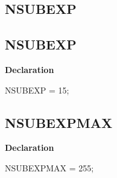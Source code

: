 \documentclass{report}
\newif\ifpdf
\begin{document}
\subsection*{\large{\textbf{NSUBEXP}}\normalsize\hspace{1ex}\hrulefill}
\else
\subsection*{NSUBEXP}
\fi
\label{RegExpr-NSUBEXP}
\begin{list}{}{
\setlength{\itemindent}{0cm}
\setlength{\listparindent}{0cm}
\setlength{\leftmargin}{\evensidemargin}
\addtolength{\leftmargin}{\tmplength}
\settowidth{\labelsep}{X}
\addtolength{\leftmargin}{\labelsep}
\setlength{\labelwidth}{\tmplength}
}
\item[\textbf{Declaration}\hfill]
\ifpdf
\begin{flushleft}
\fi
\begin{ttfamily}
NSUBEXP = 15;\end{ttfamily}

\ifpdf
\end{flushleft}
\fi

\end{list}
\ifpdf
\subsection*{\large{\textbf{NSUBEXPMAX}}\normalsize\hspace{1ex}\hrulefill}
\else
\subsection*{NSUBEXPMAX}
\fi
\label{RegExpr-NSUBEXPMAX}
\begin{list}{}{
\setlength{\itemindent}{0cm}
\setlength{\listparindent}{0cm}
\setlength{\leftmargin}{\evensidemargin}
\addtolength{\leftmargin}{\tmplength}
\settowidth{\labelsep}{X}
\addtolength{\leftmargin}{\labelsep}
\setlength{\labelwidth}{\tmplength}
}
\item[\textbf{Declaration}\hfill]
\ifpdf
\begin{flushleft}
\fi
\begin{ttfamily}
NSUBEXPMAX = 255;\end{ttfamily}

\ifpdf
\end{flushleft}
\fi

\end{list}
\ifpdf
\end{document}

